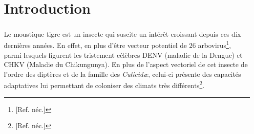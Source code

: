 \chapter{Introduction}

\paragraph{}

Le moustique tigre  est un insecte qui suscite un intérêt croissant depuis ces dix dernières années.
En effet, en plus d'être vecteur potentiel de 26 arbovirus\footnote{[Ref. néc.]}, parmi lesquels figurent les tristement célèbres DENV (maladie de la Dengue) et CHKV (Maladie du Chikungunya).
En plus de l'aspect vectoriel de cet insecte de l'ordre des diptères et de la famille des \textit{Culicidæ}, celui-ci présente des capacités adaptatives lui permettant de coloniser des climats très différents\footnote{[Ref. néc.]}.

